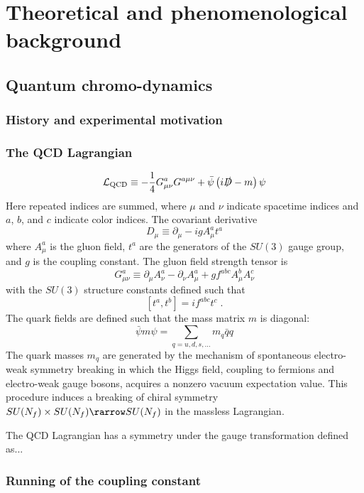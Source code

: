 \chapter{Theoretical and phenomenological background}
\label{ch:background}

\section{Quantum chromo-dynamics}
\subsection{History and experimental motivation}
\subsection{The QCD Lagrangian}
\begin{equation}
  \mathcal{L}_\mathrm{QCD} \equiv -\frac{1}{4} G^a_{\mu\nu}G^{a\mu\nu} + \bar{\psi} \left( i \slashed{D} - m \right) \psi
\end{equation}
Here repeated indices are summed, where $\mu$ and $\nu$ indicate spacetime indices and $a$, $b$, and $c$ indicate color indices.
The covariant derivative
\[ D_\mu \equiv \partial_\mu - i g A^a_\mu t^a\]
where $A^a_\mu$ is the gluon field, $t^a$ are the generators of the $SU(3)$ gauge group, and $g$ is the coupling constant.
The gluon field strength tensor is
\[ G^a_{\mu\nu} \equiv \partial_\mu A^a_\nu - \partial_\nu A^a_\mu + g f^{abc} A^b_\mu A^c_\nu \]
with the $SU(3)$ structure constants defined such that
\[ [t^a,t^b] = if^{abc}t^c \; .\]
The quark fields are defined such that the mass matrix $m$ is diagonal:
\[ \bar{\psi}m\psi = \sum_{q = u,d,s,\ldots} m_{q}\bar{q}q \]
The quark masses $m_q$ are generated by the mechanism of spontaneous electro-weak symmetry breaking in which the Higgs field, coupling to fermions and electro-weak gauge bosons, acquires a nonzero vacuum expectation value.
This procedure induces a breaking of chiral symmetry $SU(N_f) \times SU(N_f) \rarrow SU(N_f)$ in the massless Lagrangian. %

The QCD Lagrangian has a symmetry under the gauge transformation defined as...

\subsection{Running of the coupling constant} %
